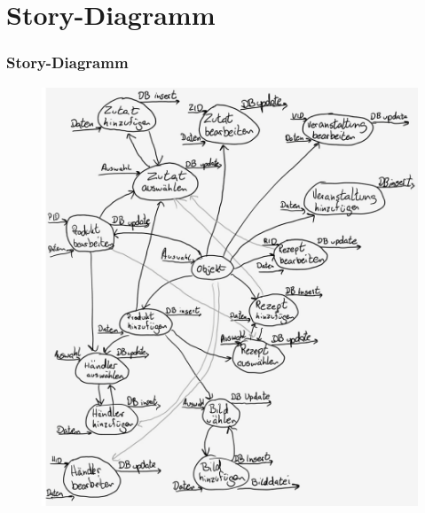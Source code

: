 \section{Story-Diagramm}
\begin{frame}
	\frametitle{Story-Diagramm}
	\begin{figure}
	\includegraphics[scale=0.125]{bilder/bubble.png}
	\end{figure}
\end{frame}